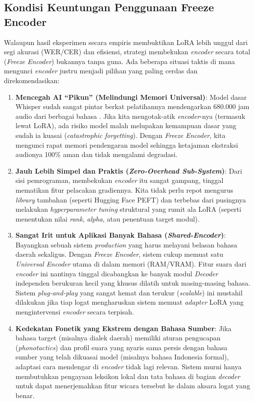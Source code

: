 \subsection{Kondisi Keuntungan Penggunaan Freeze Encoder}

Walaupun hasil eksperimen secara empiris membuktikan LoRA lebih unggul dari segi akurasi (WER/CER) dan efisiensi, strategi membekukan \textit{encoder} secara total (\textit{Freeze Encoder}) bukannya tanpa guna. Ada beberapa situasi taktis di mana mengunci \textit{encoder} justru menjadi pilihan yang paling cerdas dan direkomendasikan:

\begin{enumerate}
    \item \textbf{Mencegah AI ``Pikun'' (Melindungi Memori Universal)}: Model dasar Whisper sudah sangat pintar berkat pelatihannya mendengarkan 680.000 jam audio dari berbagai bahasa \cite{radford2023whisper}. Jika kita mengotak-atik \textit{encoder}-nya (termasuk lewat LoRA), ada risiko model malah melupakan kemampuan dasar yang sudah ia kuasai (\textit{catastrophic forgetting}). Dengan \textit{Freeze Encoder}, kita mengunci rapat memori pendengaran model sehingga ketajaman ekstraksi audionya 100\% aman dan tidak mengalami degradasi.
    
    \item \textbf{Jauh Lebih Simpel dan Praktis (\textit{Zero-Overhead Sub-System})}: Dari sisi pemrograman, membekukan \textit{encoder} itu sangat gampang, tinggal mematikan fitur pelacakan gradiennya. Kita tidak perlu repot mengurus \textit{library} tambahan (seperti Hugging Face PEFT) dan terbebas dari pusingnya melakukan \textit{hyperparameter tuning} struktural yang rumit ala LoRA (seperti menentukan nilai \textit{rank}, \textit{alpha}, atau penentuan target modul).
    
    \item \textbf{Sangat Irit untuk Aplikasi Banyak Bahasa (\textit{Shared-Encoder})}: Bayangkan sebuah sistem \textit{production} yang harus melayani belasan bahasa daerah sekaligus. Dengan \textit{Freeze Encoder}, sistem cukup memuat satu \textit{Universal Encoder} utama di dalam memori (RAM/VRAM). Fitur suara dari \textit{encoder} ini nantinya tinggal dicabangkan ke banyak modul \textit{Decoder} independen berukuran kecil yang khusus dilatih untuk masing-masing bahasa. Sistem \textit{plug-and-play} yang sangat hemat dan terukur (\textit{scalable}) ini mustahil dilakukan jika tiap logat mengharuskan sistem memuat \textit{adapter} LoRA yang mengintervensi \textit{encoder} secara terpisah.
    
    \item \textbf{Kedekatan Fonetik yang Ekstrem dengan Bahasa Sumber}: Jika bahasa target (misalnya dialek daerah) memiliki aturan pengucapan (\textit{phonotactics}) dan profil suara yang nyaris sama persis dengan bahasa sumber yang telah dikuasai model (misalnya bahasa Indonesia formal), adaptasi cara mendengar di \textit{encoder} tidak lagi relevan. Sistem murni hanya membutuhkan pengayaan leksikon lokal dan tata bahasa di bagian \textit{decoder} untuk dapat menerjemahkan fitur wicara tersebut ke dalam aksara logat yang benar.
\end{enumerate}

